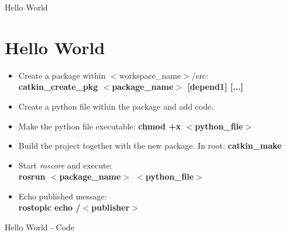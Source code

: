 \documentclass[11pt]{beamer}
\begin{document}
	\begin{frame}{Hello World}
		\section{Hello World}
		\begin{itemize}
			\item{Create a package within $<$workspace\_name$>$/src:\\ \textbf{catkin\_create\_pkg $<$package\_name$>$ [depend1] [...]}}
			\item{Create a python file within the package and add code.}
			\item{Make the python file executable: \textbf{chmod +x $<$python\_file$>$}}
			\item{Build the project together with the new package. In root: \textbf{catkin\_make}}
			\item{Start \textit{roscore} and execute:\\ \textbf{rosrun $<$package\_name$>$ $<$python\_file$>$}}
			\item{Echo published message:\\ \textbf{rostopic echo /$<$publisher$>$}}
		\end{itemize}
	\end{frame}

	\begin{frame}{Hello World - Code}
		\ssmall \inputminted{python}{code/talker.py}
	\end{frame}
\end{document}
